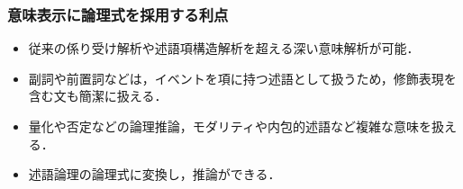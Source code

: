 \documentclass[dvipdfmx]{beamer}
\newcommand{\LF}[1]{\ensuremath{\texttt{\bf #1}}}
\begin{document}



\begin{frame}
\frametitle{意味表示に論理式を採用する利点}

\begin{itemize}
 \item 従来の係り受け解析や述語項構造解析を超える深い意味解析が可能．%
 \item 副詞や前置詞などは，イベントを項に持つ述語として扱うため，修飾表現を含む文も簡潔に扱える． %
 \item 量化や否定などの論理推論，モダリティや内包的述語など複雑な意味を扱える．
 \item 述語論理の論理式に変換し，推論ができる．
\end{itemize}
 \end{frame}
\end{document}
